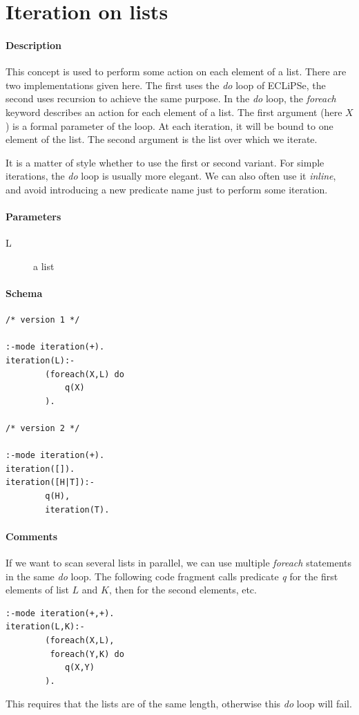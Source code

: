 \documentclass[a4paper,12pt]{report}
\begin{document}
\section{Iteration on lists}
\paragraph{Description}
This concept is used to perform some action on each element of a list. There are two implementations given here. The first uses the {\it do} loop of ECLiPSe, the second uses recursion to achieve the same purpose. In the {\it do} loop, the {\it foreach} keyword describes an action for each element of a list. The first argument (here $X$) is a formal parameter of the loop. At each iteration, it will be bound to one element of the list. The second argument is the list over which we iterate.

It is a matter of style whether to use the first or second variant. For simple iterations, the {\it do} loop is usually more elegant. We can also often use it {\it  inline}, and avoid introducing a new predicate name just to perform some iteration.
\paragraph{Parameters}
\begin{description}
\item[L] a list
\end{description}
\paragraph{Schema}
\begin{verbatim}
/* version 1 */

:-mode iteration(+).
iteration(L):-
        (foreach(X,L) do
            q(X)
        ).

/* version 2 */

:-mode iteration(+).
iteration([]).
iteration([H|T]):-
        q(H),
        iteration(T).

\end{verbatim}
\paragraph{Comments}
If we want to scan several lists in parallel, we can use multiple {\it foreach} statements in the same {\it do} loop. The following code fragment calls predicate {\it q} for the first elements of list $L$ and $K$, then for the second elements, etc.
\begin{verbatim}
:-mode iteration(+,+).
iteration(L,K):-
        (foreach(X,L),
         foreach(Y,K) do
            q(X,Y)
        ).
\end{verbatim}
This requires that the lists are of the same length, otherwise this {\it do} loop will fail. 
\end{document}
